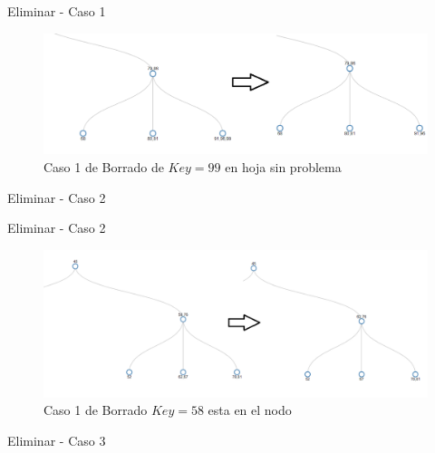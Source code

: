 \documentclass[11pt]{beamer}
\begin{document}
		\begin{frame}{Eliminar - Caso 1}
			\justifying
			\begin{figure}[H]
				\centering
				\includegraphics[scale=0.35]{img/btree_del_1.png}
				\caption{Caso 1 de Borrado de $Key=99$ en hoja sin problema \cite{CLRS2009}}
				\label{fig:btree_del_1}
			\end{figure}
		\end{frame}
		
		
		\begin{frame}{Eliminar - Caso 2}
			\justifying
			
			
			
		\end{frame}
		
		\begin{frame}{Eliminar - Caso 2}
			\justifying
			\begin{figure}[H]
				\centering
				\includegraphics[scale=0.30]{img/btree_del_2.png}
				\caption{Caso 1 de Borrado $Key=58$ esta en el nodo \cite{CLRS2009}}
				\label{fig:btree_del_2}
			\end{figure}
		\end{frame}
		
		\begin{frame}{Eliminar - Caso 3}
			\justifying
			
			
			
		\end{frame}
		
\end{document}
